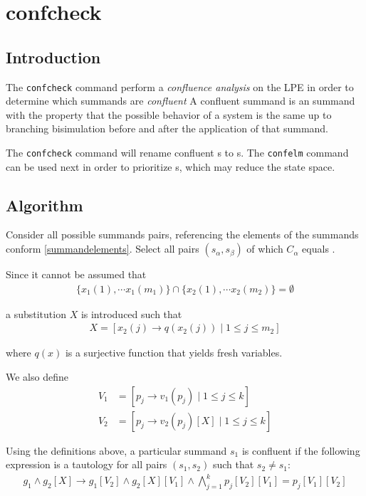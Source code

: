 \chapter{confcheck} \label{confcheck}

\section{Introduction}

The \texttt{confcheck} command perform a \emph{confluence analysis} on the LPE in order to determine which \istep{} summands are \emph{confluent}
A confluent \istep{} summand is an \istep{} summand with the property that the possible behavior of a system is the same up to branching bisimulation before and after the application of that summand.

The \texttt{confcheck} command will rename confluent \istep{}s to \cistep{}s.
The \texttt{confelm} command can be used next in order to prioritize \cistep{}s, which may reduce the state space.

\section{Algorithm}

Consider all possible summands pairs, referencing the elements of the summands conform \ref{summandelements}.
Select all pairs $(s_\alpha, s_\beta)$ of which $C_\alpha$ equals \istep{}.

Since it cannot be assumed that
\begin{align*}
\{ x_1(1), \cdots{} x_1(m_1) \} \cap \{ x_2(1), \cdots{} x_2(m_2) \} = \emptyset{}
\end{align*}

a substitution $X$ is introduced such that
\begin{align*}
X = [ x_2(j) \rightarrow q(x_2(j)) \;|\; 1 \leq j \leq m_2 ]
\end{align*}

where $q(x)$ is a surjective function that yields fresh variables.

We also define
\begin{align*}
V_{1} &= [p_j \rightarrow v_1(p_j) \;|\; 1 \leq j \leq k] \\
V_{2} &= [p_j \rightarrow v_2(p_j)[X] \;|\; 1 \leq j \leq k]
\end{align*}

Using the definitions above, a particular \istep{} summand $s_1$ is confluent if the following expression is a tautology for all pairs $(s_1, s_2)$ such that $s_2 \neq s_1$:
\begin{align*}
g_1 \land g_2[X] \rightarrow g_1[V_2] \land g_2[X][V_1] \land \bigwedge\limits_{j=1}^{k} p_j[V_2][V_1] = p_j[V_1][V_2]
\end{align*}

